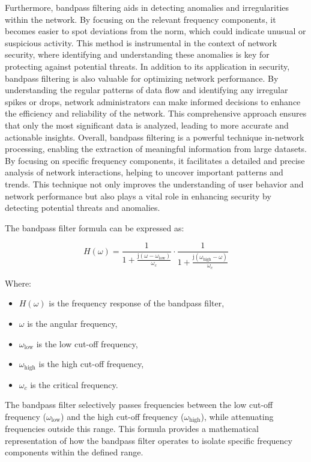Furthermore, bandpass filtering aids in detecting anomalies and irregularities within the network. By focusing on the relevant frequency components, it becomes easier to spot deviations from the norm, which could indicate unusual or suspicious activity. This method is instrumental in the context of network security, where identifying and understanding these anomalies is key for protecting against potential threats. In addition to its application in security, bandpass filtering is also valuable for optimizing network performance. By understanding the regular patterns of data flow and identifying any irregular spikes or drops, network administrators can make informed decisions to enhance the efficiency and reliability of the network. This comprehensive approach ensures that only the most significant data is analyzed, leading to more accurate and actionable insights. Overall, bandpass filtering is a powerful technique in-network processing, enabling the extraction of meaningful information from large datasets. By focusing on specific frequency components, it facilitates a detailed and precise analysis of network interactions, helping to uncover important patterns and trends. This technique not only improves the understanding of user behavior and network performance but also plays a vital role in enhancing security by detecting potential threats and anomalies.

The bandpass filter formula can be expressed as:

\[ H(\omega) = \frac{1}{1 + \frac{\mathrm{j}(\omega - \omega_{\text{low}})}{\omega_{c}}} \cdot \frac{1}{1 + \frac{\mathrm{j}(\omega_{\text{high}} - \omega)}{\omega_{c}}} \]

Where:
\begin{itemize}
    \item \( H(\omega) \) is the frequency response of the bandpass filter,
    \item \( \omega \) is the angular frequency,
    \item \( \omega_{\text{low}} \) is the low cut-off frequency,
    \item \( \omega_{\text{high}} \) is the high cut-off frequency,
    \item \( \omega_{c} \) is the critical frequency.
  \end{itemize}

The bandpass filter selectively passes frequencies between the low cut-off frequency (\(\omega_{\text{low}}\)) and the high cut-off frequency (\(\omega_{\text{high}}\)), while attenuating frequencies outside this range. This formula provides a mathematical representation of how the bandpass filter operates to isolate specific frequency components within the defined range.

